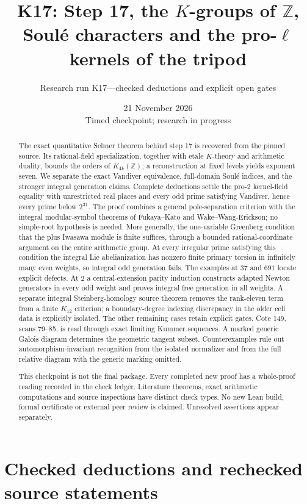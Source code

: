 \documentclass[11pt,a4paper]{article}
\title{K17: Step 17, the $K$-groups of $\mathbb Z$,\\
Soul\'e characters and the pro-$\ell$ kernels of the tripod}
\author{Research run K17---checked deductions and explicit open gates}
\date{21 November 2026\\Timed checkpoint; research in progress}
\theoremstyle{definition}
\begin{document}
\maketitle
\begin{abstract}
The exact quantitative Selmer theorem behind step 17 is recovered from
the pinned source. Its rational-field specialization, together with
etale $K$-theory and arithmetic duality, bounds the orders of
$K_{4k}(\mathbb Z)$; a reconstruction at fixed levels yields exponent
seven. We separate the exact Vandiver equivalence, full-domain Soul\'e
indices, and the stronger integral generation claims. Complete
deductions settle the pro-$2$ kernel-field equality with unrestricted
real places and every odd prime satisfying Vandiver, hence every
prime below $2^{31}$. The proof combines a general pole-separation
criterion with the integral modular-symbol theorems of Fukaya--Kato
and Wake--Wang-Erickson; no simple-root hypothesis is needed. More generally, the one-variable Greenberg
condition that the plus Iwasawa module is finite suffices, through a
bounded rational-coordinate argument on the entire arithmetic group. At every
irregular prime satisfying this condition the integral Lie abelianization has nonzero
finite primary torsion in infinitely many even weights, so integral odd
generation fails. The examples at $37$ and $691$ locate explicit defects.
At $2$ a central-extension
parity induction constructs adapted Newton generators in every odd
weight and proves integral free generation in all weights. A separate
integral Steinberg-homology source theorem removes the rank-eleven term
from a finite $K_{12}$ criterion; a boundary-degree indexing discrepancy
in the older cell data is explicitly isolated. The other remaining
cases retain explicit gates. Cote 149, scans 79--85, is read through
exact limiting Kummer sequences. A marked generic Galois diagram
determines the geometric tangent subset. Counterexamples rule out
automorphism-invariant recognition from the isolated normalizer and
from the full relative diagram with the generic marking omitted.

This checkpoint is not the final package. Every completed new proof
has a whole-proof reading recorded in the check ledger. Literature
theorems, exact arithmetic computations and source inspections have
distinct check types. No new Lean build, formal certificate or external
peer review is claimed. Unresolved assertions appear separately.
\end{abstract}
\tableofcontents
\clearpage
\part{Checked deductions and rechecked source statements}
\end{document}
